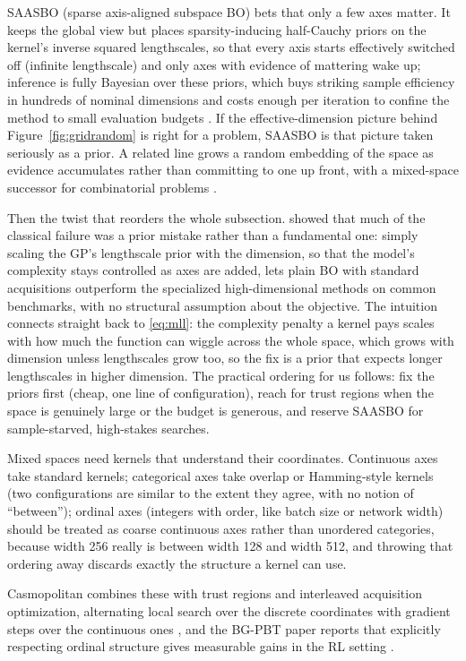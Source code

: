 SAASBO (sparse axis-aligned subspace BO) bets that only a few axes
matter. It keeps the global view but
places sparsity-inducing half-Cauchy priors on the kernel's inverse
squared lengthscales, so that every axis starts effectively switched off
(infinite lengthscale) and only axes with evidence of mattering wake up;
inference is fully Bayesian over these priors, which buys striking sample
efficiency in hundreds of nominal dimensions and costs enough per
iteration to confine the method to small evaluation budgets
\citep{eriksson2021saasbo}. If the effective-dimension picture behind
Figure~\ref{fig:gridrandom} is right for a problem, SAASBO is that
picture taken seriously as a prior. A related line grows a random
embedding of the space as evidence accumulates rather than committing to
one up front, with a mixed-space successor for combinatorial problems
\citep{papenmeier2022baxus, papenmeier2023bounce}.

Then the twist that reorders the whole subsection. \citet{hvarfner2024vanilla}
showed that much of the classical failure was a prior mistake rather than
a fundamental one: simply scaling the GP's lengthscale prior with the
dimension, so that the model's complexity stays controlled as axes are
added, lets plain BO with standard acquisitions outperform the
specialized high-dimensional methods on common benchmarks, with no
structural assumption about the objective. The intuition connects
straight back to \eqref{eq:mll}: the complexity penalty a kernel pays
scales with how much the function can wiggle across the whole space,
which grows with dimension unless lengthscales grow too, so the fix is a
prior that expects longer lengthscales in higher dimension. The
practical ordering for us follows: fix the priors first (cheap, one line
of configuration), reach for trust regions when the space is genuinely
large or the budget is generous, and reserve SAASBO for sample-starved,
high-stakes searches.

Mixed spaces need kernels that understand their coordinates. Continuous
axes take standard kernels; categorical axes take overlap or
Hamming-style kernels (two configurations are similar to the extent they
agree, with no notion of ``between''); ordinal axes (integers with
order, like batch size or network width) should be treated as coarse
continuous axes rather than unordered categories, because width 256
really is between width 128 and width 512, and throwing that ordering
away discards exactly the structure a kernel can use.

Casmopolitan
combines these with trust regions and interleaved acquisition
optimization, alternating local search over the discrete coordinates
with gradient steps over the continuous ones \citep{wan2021casmopolitan},
and the BG-PBT paper reports that explicitly respecting ordinal
structure gives measurable gains in the RL setting \citep{wan2022bgpbt}.

